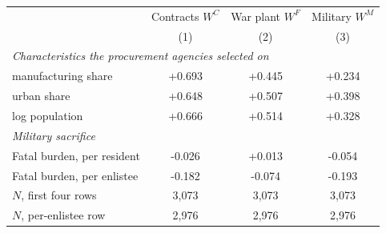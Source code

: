 \begin{tabular}{lccc}
\toprule
& Contracts $W^C$ & War plant $W^F$ & Military $W^M$ \\
& (1) & (2) & (3) \\
\midrule
\multicolumn{4}{l}{\emph{Characteristics the procurement agencies selected on}} \\
\quad 1940 manufacturing share & +0.693 & +0.445 & +0.234 \\
\quad 1940 urban share & +0.648 & +0.507 & +0.398 \\
\quad 1940 log population & +0.666 & +0.514 & +0.328 \\
\multicolumn{4}{l}{\emph{Military sacrifice}} \\
\quad Fatal burden, per resident & -0.026 & +0.013 & -0.054 \\
\quad Fatal burden, per enlistee & -0.182 & -0.074 & -0.193 \\
\midrule
$N$, first four rows & 3,073 & 3,073 & 3,073 \\
$N$, per-enlistee row & 2,976 & 2,976 & 2,976 \\
\bottomrule
\end{tabular}